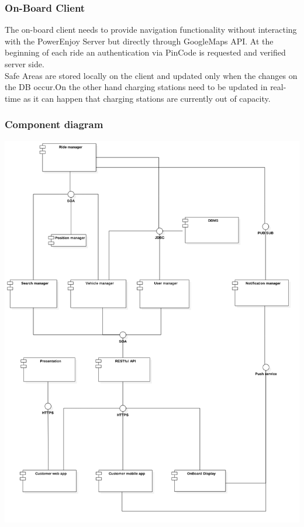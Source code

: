 \subsubsection{On-Board Client}
The on-board client needs to provide navigation functionality without interacting with the PowerEnjoy Server but directly through GoogleMaps API. At the beginning of each ride an authentication via PinCode is requested and verified server side.\\Safe Areas are stored locally on the client and updated only when the changes on the DB occur.On the other hand charging stations need to be updated in real-time as it can happen that charging stations are currently out of capacity.



\subsubsection{Component diagram}
\begin{center}
\includegraphics[scale=0.35]{Images/ComponentDiagram/ComponentDiagram.png}
\end{center}
\newpage

